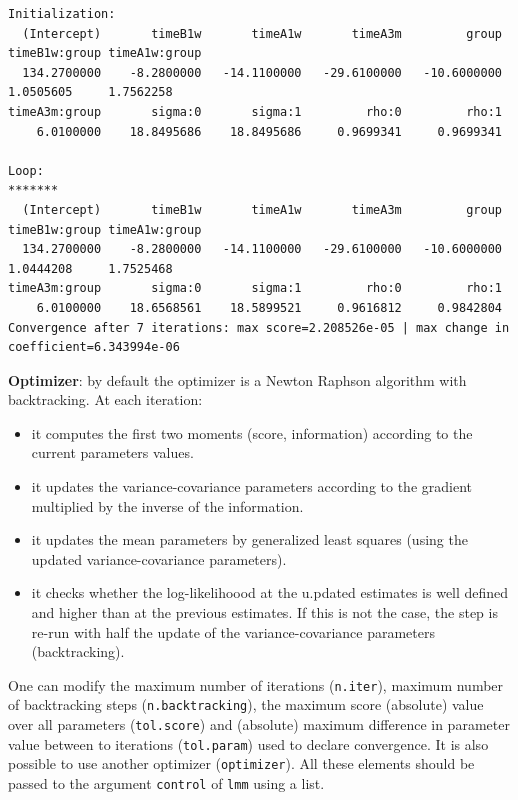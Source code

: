 \documentclass[12pt]{article}
\begin{document}
\begin{verbatim}
Initialization:
  (Intercept)       timeB1w       timeA1w       timeA3m         group timeB1w:group timeA1w:group 
  134.2700000    -8.2800000   -14.1100000   -29.6100000   -10.6000000     1.0505605     1.7562258 
timeA3m:group       sigma:0       sigma:1         rho:0         rho:1 
    6.0100000    18.8495686    18.8495686     0.9699341     0.9699341 

Loop:
*******
  (Intercept)       timeB1w       timeA1w       timeA3m         group timeB1w:group timeA1w:group 
  134.2700000    -8.2800000   -14.1100000   -29.6100000   -10.6000000     1.0444208     1.7525468 
timeA3m:group       sigma:0       sigma:1         rho:0         rho:1 
    6.0100000    18.6568561    18.5899521     0.9616812     0.9842804 
Convergence after 7 iterations: max score=2.208526e-05 | max change in coefficient=6.343994e-06
\end{verbatim}

\textbf{Optimizer}: by default the optimizer is a Newton Raphson algorithm
with backtracking. At each iteration:
\begin{itemize}
\item it computes the first two moments (score, information) according to
the current parameters values.
\item it updates the variance-covariance parameters according to the
gradient multiplied by the inverse of the information.
\item it updates the mean parameters by generalized least squares (using
the updated variance-covariance parameters).
\item it checks whether the log-likelihoood at the u.pdated estimates is
well defined and higher than at the previous estimates. If this is
not the case, the step is re-run with half the update of the
variance-covariance parameters (backtracking).
\end{itemize}

One can modify the maximum number of iterations (\texttt{n.iter}), maximum
number of backtracking steps (\texttt{n.backtracking}), the maximum score
(absolute) value over all parameters (\texttt{tol.score}) and (absolute)
maximum difference in parameter value between to iterations
(\texttt{tol.param}) used to declare convergence. It is also possible to use
another optimizer (\texttt{optimizer}). All these elements should be passed
to the argument \texttt{control} of \texttt{lmm} using a list.

\clearpage
\end{document}
